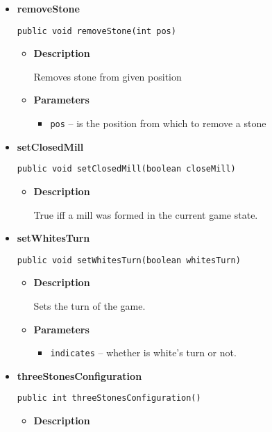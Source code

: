 \documentclass[11pt,a4paper]{report}
\begin{document}
{{{{{{{{{{{\begin{itemize}
{\begin{itemize}
{Remaining white stones to put in the board.
}
\item{{\bf  Returns} -- 
the number of white stones that still can be put in the board. 
}%
\end{itemize}
}%
\item{ 
{\bf  removeStone}\\
\begin{lstlisting}[frame=none]
public void removeStone(int pos)\end{lstlisting} %
\begin{itemize}
\item{
{\bf  Description}

Removes stone from given position
}
\item{
{\bf  Parameters}
  \begin{itemize}
   \item{
\texttt{pos} -- is the position from which to remove a stone}
  \end{itemize}
}%
\end{itemize}
}%
\item{ 
{\bf  setClosedMill}\\
\begin{lstlisting}[frame=none]
public void setClosedMill(boolean closeMill)\end{lstlisting} %
\begin{itemize}
\item{
{\bf  Description}

True iff a mill was formed in the current game state.
}
\end{itemize}
}%
\item{ 
{\bf  setWhitesTurn}\\
\begin{lstlisting}[frame=none]
public void setWhitesTurn(boolean whitesTurn)\end{lstlisting} %
\begin{itemize}
\item{
{\bf  Description}

Sets the turn of the game.
}
\item{
{\bf  Parameters}
  \begin{itemize}
   \item{
\texttt{indicates} -- whether is white's turn or not.}
  \end{itemize}
}%
\end{itemize}
}%
\item{ 
{\bf  threeStonesConfiguration}\\
\begin{lstlisting}[frame=none]
public int threeStonesConfiguration()\end{lstlisting} %
\begin{itemize}
\item{
{\bf  Description}

}
\end{itemize}}
\end{itemize}}}}}}}}}}}}
\end{document}
